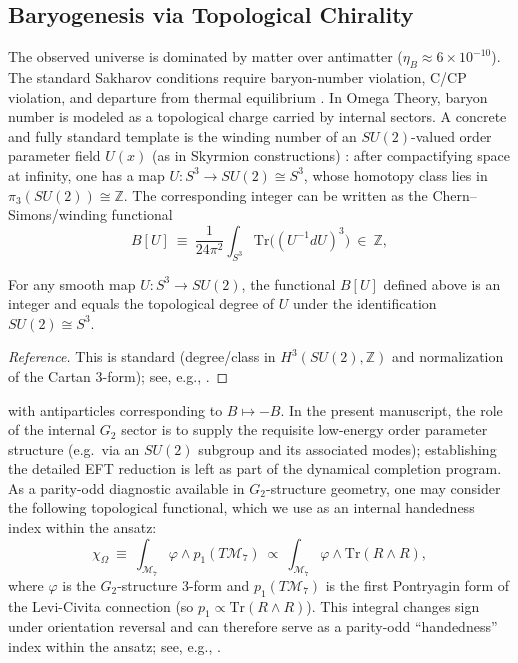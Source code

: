 \subsection{Baryogenesis via Topological Chirality}
The observed universe is dominated by matter over antimatter ($\eta_B \approx 6 \times 10^{-10}$). The standard Sakharov conditions require baryon-number violation, C/CP violation, and departure from thermal equilibrium \cite{Sakharov1967Baryogenesis}.
In Omega Theory, baryon number is modeled as a topological charge carried by internal sectors. A concrete and fully standard template is the winding number of an $SU(2)$-valued order parameter field $U(x)$ (as in Skyrmion constructions) \cite{Nakahara2003}: after compactifying space at infinity, one has a map $U:S^3\to SU(2)\cong S^3$, whose homotopy class lies in $\pi_3(SU(2))\cong\mathbb{Z}$. The corresponding integer can be written as the Chern--Simons/winding functional
\begin{equation}
    B[U]\ \equiv\ \frac{1}{24\pi^2}\int_{S^3}\mathrm{Tr}\bigl((U^{-1}dU)^3\bigr)\ \in\ \mathbb{Z},
\end{equation}
\begin{lemma}
\label{lemma:winding_integer}
For any smooth map $U:S^3\to SU(2)$, the functional $B[U]$ defined above is an integer and equals the topological degree of $U$ under the identification $SU(2)\cong S^3$.
\end{lemma}
\begin{proof}[Reference]
This is standard (degree/class in $H^3(SU(2),\mathbb{Z})$ and normalization of the Cartan 3-form); see, e.g., \cite{Nakahara2003}.
\end{proof}
with antiparticles corresponding to $B\mapsto -B$. In the present manuscript, the role of the internal $G_2$ sector is to supply the requisite low-energy order parameter structure (e.g.\ via an $SU(2)$ subgroup and its associated modes); establishing the detailed EFT reduction is left as part of the dynamical completion program.
As a parity-odd diagnostic available in $G_2$-structure geometry, one may consider the following topological functional, which we use as an internal handedness index within the ansatz:
\begin{equation}
    \chi_{\Omega}\ \equiv\ \int_{\mathcal{M}_7} \varphi \wedge p_1(T\mathcal{M}_7)
    \ \propto\ \int_{\mathcal{M}_7} \varphi \wedge \mathrm{Tr}(R\wedge R),
\end{equation}
where $\varphi$ is the $G_2$-structure 3-form and $p_1(T\mathcal{M}_7)$ is the first Pontryagin form of the Levi-Civita connection (so $p_1\propto \mathrm{Tr}(R\wedge R)$). This integral changes sign under orientation reversal and can therefore serve as a parity-odd ``handedness'' index within the ansatz; see, e.g., \cite{Joyce2000SpecialHolonomy}.
